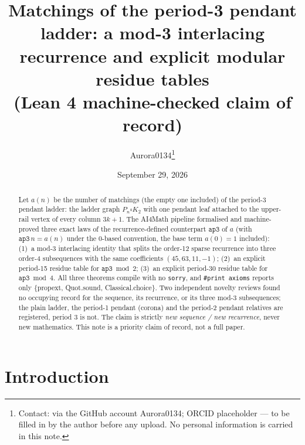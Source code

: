 \documentclass[11pt]{article}
\title{Matchings of the period-3 pendant ladder: a mod-3 interlacing
recurrence and explicit modular residue tables\\ (Lean 4 machine-checked
claim of record)}
\author{Aurora0134\thanks{Contact: via the GitHub account Aurora0134; ORCID
placeholder --- to be filled in by the author before any upload. No personal
information is carried in this note.}}
\date{September 29, 2026}
\begin{document}
\maketitle

\begin{abstract}
Let $a(n)$ be the number of matchings (the empty one included) of the
period-3 pendant ladder: the ladder graph $P_n\square K_2$ with one pendant
leaf attached to the upper-rail vertex of every column $3k+1$. The AI4Math
pipeline formalised and machine-proved three exact laws of the
recurrence-defined counterpart $\mathtt{ap3}$ of $a$ (with
$\mathtt{ap3}\,n=a(n)$ under the $0$-based convention, the base term $a(0)=1$ included): (1)~a mod-3 interlacing identity that splits the
order-12 sparse recurrence into three order-4 subsequences with the same
coefficients $(45,63,11,-1)$; (2)~an explicit period-15 residue table for
$\mathtt{ap3}\bmod 2$; (3)~an explicit period-30 residue table for
$\mathtt{ap3}\bmod 4$. All three theorems compile with no \texttt{sorry},
and \texttt{\#print axioms} reports only \{propext, Quot.sound,
Classical.choice\}. Two independent novelty reviews found no occupying
record for the sequence, its recurrence, or its three mod-3 subsequences;
the plain ladder, the period-1 pendant (corona) and the period-2 pendant
relatives are registered, period 3 is not. The claim is strictly
\emph{new sequence / new recurrence}, never new mathematics. This note is a
priority claim of record, not a full paper.
\end{abstract}

\section{Introduction}
\end{document}
